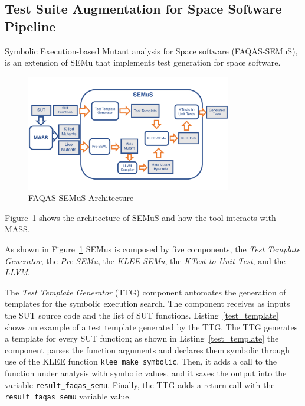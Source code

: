 
\newpage
\subsection{Test Suite Augmentation for Space Software Pipeline}
\label{sec:semus}

Symbolic Execution-based Mutant analysis for Space software (FAQAS-SEMuS), is an extension of SEMu that implements test generation for space software. 

\begin{figure}[tb]
\begin{center}
\includegraphics[width=0.8\textwidth]{images/semus-architecture}
\caption{FAQAS-SEMuS Architecture}
\label{fig:semus_architecture}
\end{center}
\end{figure}

Figure~\ref{fig:semus_architecture} shows the architecture of SEMuS and how the tool interacts with MASS.


As shown in Figure~\ref{fig:semus_architecture} SEMus is composed by five components, the \emph{Test Template Generator}, the \emph{Pre-SEMu}, the \emph{KLEE-SEMu}, the \emph{KTest to Unit Test}, and the \emph{LLVM}.



The \emph{Test Template Generator} (TTG) component automates the generation of templates for the symbolic execution search. The component receives as inputs the SUT source code and the list of SUT functions. 
Listing~\ref{test_template} shows an example of a test template generated by the TTG. The TTG generates a template for every SUT function; as shown in Listing~\ref{test_template} the component parses the function arguments and declares them symbolic through use of the KLEE function \texttt{klee\_make\_symbolic}. Then, it adds a call to the function under analysis with symbolic values, and it saves the output into the variable \texttt{result\_faqas\_semu}. Finally, the TTG adds a return call with the \texttt{result\_faqas\_semu} variable value.

